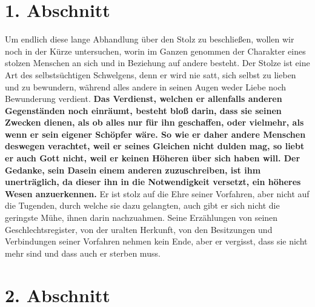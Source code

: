 \newpage

\section{1. Abschnitt} \label{kap12_ab1}

 Um endlich diese lange Abhandlung über den Stolz
zu beschließen, wollen wir noch
in der Kürze untersuchen, worin im Ganzen genommen der Charakter eines stolzen
Menschen an sich und in Beziehung auf andere besteht. Der Stolze ist eine Art
des
selbstsüchtigen Schwelgens, denn er wird nie satt, sich selbst zu lieben und zu
bewundern, während alles andere in seinen Augen weder Liebe noch Bewunderung
verdient.    \label{ref:12_01_egoisten}
\textbf{Das Verdienst, welchen er allenfalls anderen
Gegenständen noch
einräumt, besteht bloß darin, dass sie seinen Zwecken dienen, als ob alles nur
für ihn geschaffen, oder vielmehr, als wenn er sein eigener Schöpfer wäre. So
wie er daher andere Menschen deswegen verachtet, weil er seines Gleichen nicht
dulden mag, so liebt er auch Gott nicht, weil er keinen Höheren über sich haben
will. Der Gedanke, sein Dasein einem anderen zuzuschreiben, ist ihm
unerträglich,
da dieser ihn in die Notwendigkeit versetzt, ein höheres Wesen anzuerkennen.}
Er
ist stolz auf die Ehre seiner Vorfahren, aber nicht auf die Tugenden, durch
welche sie dazu gelangten, auch gibt er sich nicht die geringste Mühe, ihnen
darin nachzuahmen. Seine Erzählungen von seinen Geschlechtsregister, von der
uralten Herkunft, von den Besitzungen und Verbindungen seiner Vorfahren nehmen
kein Ende, aber er vergisst, dass sie nicht mehr sind und dass auch er sterben
muss.

\section{2. Abschnitt} \label{kap12_ab2}

